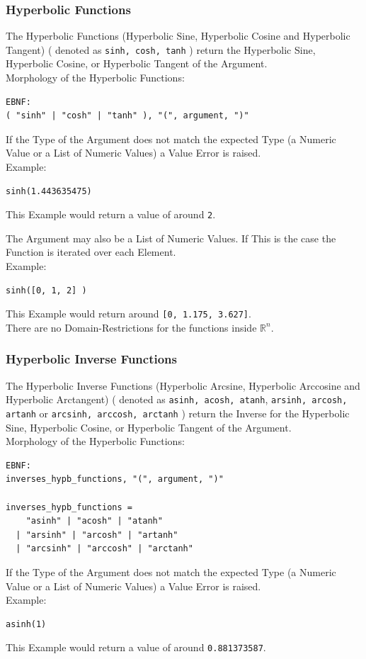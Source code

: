 \documentclass{report}
\begin{document}
\subsubsection{Hyperbolic Functions}
The Hyperbolic Functions (Hyperbolic Sine, Hyperbolic Cosine and Hyperbolic Tangent) ( denoted as \texttt{sinh, cosh, tanh} ) return the Hyperbolic Sine, Hyperbolic Cosine, or Hyperbolic Tangent of the Argument. \\
Morphology of the Hyperbolic Functions:
\begin{verbatim}
EBNF:
( "sinh" | "cosh" | "tanh" ), "(", argument, ")"
\end{verbatim}
If the Type of the Argument does not match the expected Type (a Numeric Value or a List of Numeric Values) a Value Error is raised.\\
Example:
\begin{verbatim}
sinh(1.443635475)
\end{verbatim}
This Example would return a value of around \texttt{2}.

The Argument may also be a List of Numeric Values. If This is the case the Function is iterated over each Element.\\
Example:
\begin{verbatim}
sinh([0, 1, 2] )
\end{verbatim}
This Example would return around \texttt{[0, 1.175, 3.627]}.\\
There are no Domain-Restrictions for the functions inside $\mathbb{R}^n$.

\subsubsection{Hyperbolic Inverse Functions}
The Hyperbolic Inverse Functions (Hyperbolic Arcsine, Hyperbolic Arccosine and Hyperbolic Arctangent) ( denoted as \texttt{asinh, acosh, atanh}, \texttt{arsinh, arcosh, artanh} or \texttt{arcsinh, arccosh, arctanh} ) return the Inverse for the Hyperbolic Sine, Hyperbolic Cosine, or Hyperbolic Tangent of the Argument. \\
Morphology of the Hyperbolic Functions:
\begin{verbatim}
EBNF:
inverses_hypb_functions, "(", argument, ")"

inverses_hypb_functions = 
    "asinh" | "acosh" | "atanh" 
  | "arsinh" | "arcosh" | "artanh"
  | "arcsinh" | "arccosh" | "arctanh"
\end{verbatim}
If the Type of the Argument does not match the expected Type (a Numeric Value or a List of Numeric Values) a Value Error is raised.\\
Example:
\begin{verbatim}
asinh(1)
\end{verbatim}
This Example would return a value of around \texttt{0.881373587}.
\end{document}
